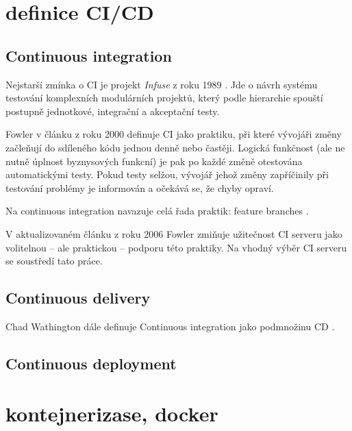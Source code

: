         \blind[5]


    \section{definice CI/CD}
        \subsection{Continuous integration}
            Nejstarší zmínka o CI je projekt \textit{Infuse} z roku 1989 \cite{kaiser-infuse}. Jde o návrh systému testování komplexních modulárních projektů, který podle hierarchie spouští postupně jednotkové, integrační a akceptační testy.

            Fowler v článku z roku 2000 \cite{fowler-ci-original} definuje CI jako praktiku, při které vývojáři změny začleňují do sdíleného kódu jednou denně nebo častěji. Logická funkčnost (ale ne nutně úplnost byznysových funkcní) je pak po každé změně otestována automatickými testy. Pokud testy selžou, vývojář jehož změny zapříčinily při testování problémy je informován a očekává se, že chyby opraví.

            Na continuous integration navazuje celá řada praktik: feature branches .

            V aktualizovaném článku z roku 2006 Fowler \cite{fowler-ci} zmiňuje užitečnost CI serveru jako volitelnou -- ale praktickou -- podporu této praktiky. Na vhodný výběr CI serveru se soustředí tato práce.

        \subsection{Continuous delivery}
            Chad Wathington dále definuje Continuous integration jako podmnožinu CD \cite{fowler-go}.

        \subsection{Continuous deployment}


        \blind[6]

    \section{kontejnerizase, docker}
        \blind[2]
